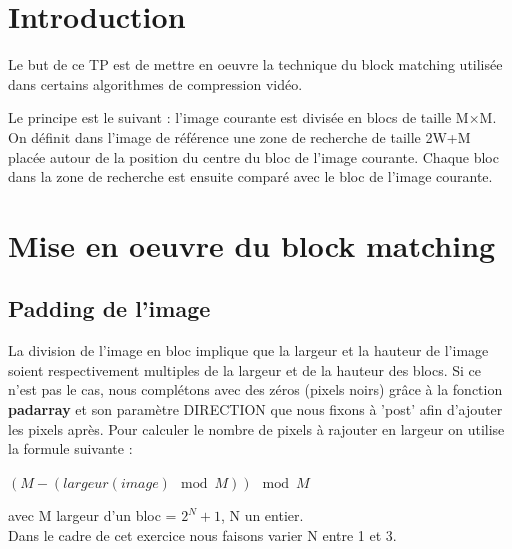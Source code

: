 \documentclass[a4paper, 12pt]{article}
\begin{document}






\clearpage

\section{Introduction}

Le but de ce TP est de mettre en oeuvre la technique du block matching utilisée dans certains algorithmes de compression vidéo.

Le principe est le suivant : l’image courante est divisée en blocs de taille M×M. On définit dans l’image de référence une zone de recherche de taille 2W+M placée autour de la position du centre du bloc de l’image courante. Chaque bloc dans la zone de recherche est ensuite comparé avec le bloc de l’image courante.

\section{Mise en oeuvre du block matching}

\subsection{Padding de l'image}

La division de l'image en bloc implique que la largeur et la hauteur de l'image soient respectivement multiples de la largeur et de la hauteur des blocs. Si ce n'est pas le cas, nous complétons avec des zéros (pixels noirs) grâce à la fonction \textbf{padarray} et son paramètre DIRECTION que nous fixons à 'post' afin d'ajouter les pixels après. Pour calculer le nombre de pixels à rajouter en largeur on utilise la formule suivante : \\

\begin{center}
	$(M - (largeur(image) \mod M)) \mod M$ \\
\end{center}
avec M largeur d'un bloc = $2^N + 1$, N un entier.\\
Dans le cadre de cet exercice nous faisons varier N entre 1 et 3.\\
\end{document}
